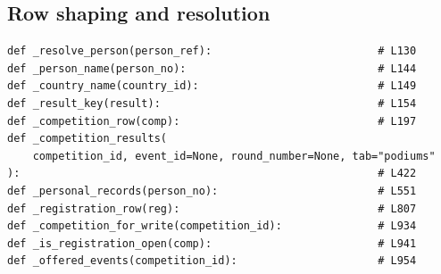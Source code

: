 \documentclass[11pt,a4paper]{article}
\begin{document}
\subsection*{Row shaping and resolution}
\begin{lstlisting}
def _resolve_person(person_ref):                          # L130
def _person_name(person_no):                              # L144
def _country_name(country_id):                            # L149
def _result_key(result):                                  # L154
def _competition_row(comp):                               # L197
def _competition_results(
    competition_id, event_id=None, round_number=None, tab="podiums"
):                                                        # L422
def _personal_records(person_no):                         # L551
def _registration_row(reg):                               # L807
def _competition_for_write(competition_id):               # L934
def _is_registration_open(comp):                          # L941
def _offered_events(competition_id):                      # L954
\end{lstlisting}
\end{document}
